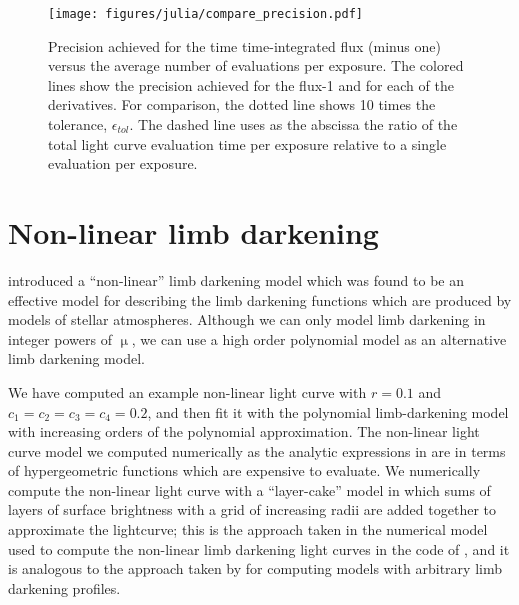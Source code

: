 \documentclass[modern,trackchanges]{aastex63}
\begin{document}
{\begin{figure}
    \begin{centering}
    \texttt{[image: figures/julia/compare\_precision.pdf]}
    \caption{Precision achieved for the time time-integrated flux (minus one)
    versus the average number of evaluations per exposure.  The colored lines
    show the precision achieved for the flux-1 and for each of the derivatives.
    For comparison, the dotted line shows 10 times the tolerance, $\epsilon_{tol}$.
    The dashed line uses as the abscissa the ratio of the total light curve evaluation 
    time per exposure relative to a single evaluation per exposure.
    \label{fig:integration_precision}}
    \end{centering}
\end{figure}

} 

\pagebreak %

\section{Non-linear limb darkening}\label{sec:nonlinear}

\citet{Claret2000} introduced a ``non-linear'' limb darkening model which
was found to be an effective model for describing the limb darkening functions
which are produced by models of stellar atmospheres.
Although we can only model limb darkening in integer powers of $\upmu$,
we can use a high order polynomial model as an alternative limb darkening model.


We have computed an example non-linear light curve with $r=0.1$ and
$c_1=c_2=c_3=c_4=0.2$, and then fit it with the polynomial limb-darkening
model with increasing orders of the polynomial approximation.  The non-linear light curve model
we computed numerically as the analytic expressions in \citet{MandelAgol2002}
are in terms of hypergeometric functions which are expensive to evaluate.
We numerically compute the non-linear light curve with a ``layer-cake'' model in which sums of
layers of surface brightness with a grid of increasing radii are added together
to approximate the lightcurve;  this
is the approach taken in the numerical model used to compute the
non-linear limb darkening light curves in the code of \citet{MandelAgol2002},
and it is analogous to the approach taken by \citet{Kreidberg2015} for
computing models with arbitrary limb darkening profiles.
\end{document}
